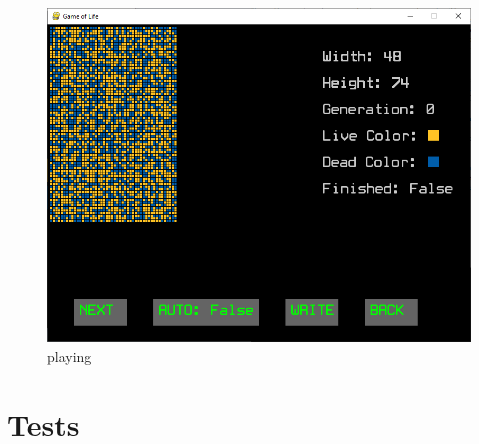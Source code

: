 \documentclass[12pt]{report}
\begin{document}
\begin{figure}[h]
    \centering
    \includegraphics[width=\textwidth]{play}
    \caption{playing}
\end{figure}

\chapter{Tests}
\end{document}
